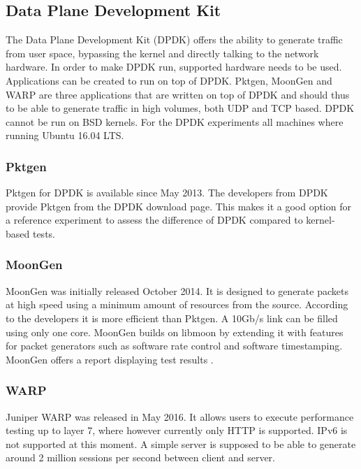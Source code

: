 \subsection{Data Plane Development Kit}\label{sub:dpdk}
The Data Plane Development Kit\cite{dpdk} (DPDK) offers the ability to generate traffic from user space, bypassing the kernel and directly talking to the network hardware. In order to make DPDK run, supported hardware needs to be used. Applications can be created to run on top of DPDK. Pktgen, MoonGen and WARP are three applications that are written on top of DPDK and should thus to be able to generate traffic in high volumes, both UDP and TCP based. DPDK cannot be run on BSD kernels. For the DPDK experiments all machines where running Ubuntu 16.04 LTS. 

\subsubsection{Pktgen}\label{subsub:dpdk-pktgen}
Pktgen for DPDK is available since May 2013. The developers from DPDK provide Pktgen from the DPDK download page. This makes it a good option for a reference experiment to assess the difference of DPDK compared to kernel-based tests. 

\subsubsection{MoonGen}\label{}
MoonGen was initially released October 2014. It is designed to generate packets at high speed using a minimum amount of resources from the source. According to the developers it is more efficient than Pktgen. A 10Gb/s link can be filled using only one core. MoonGen builds on libmoon \cite{libmoon} by extending it with features for packet generators such as software rate control and software timestamping. MoonGen offers a report displaying test results \cite{moongenreport}.

\subsubsection{WARP}\label{subsub:dpdk-WARP17}
Juniper WARP was released in May 2016. It allows users to execute performance testing up to layer 7, where however currently only HTTP is supported. IPv6 is not supported at this moment. A simple server is supposed to be able to generate around 2 million sessions per second between client and server.  


